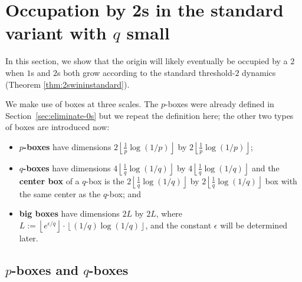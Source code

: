 \documentclass{article}
\newcommand{\floor}[1]{\left\lfloor#1\right \rfloor}
\numberwithin{equation}{section}
\begin{document}
\section{Occupation by 2s in the standard variant with $q$ small}
\label{sec:occupation-2-standard}

In this section, we show that the origin will likely eventually be occupied by a $2$ when $1$s and $2$s both grow according to the standard threshold-$2$ dynamics (Theorem \ref{thm:2swininstandard}).

We make use of boxes at three scales. The $p$-boxes were already defined in
Section~\ref{sec:eliminate-0s} but we repeat the definition here; the other two 
types of boxes are introduced now:
\begin{itemize}
    \item \textbf{$p$-boxes} have dimensions $2\floor{\frac{1}{p}\log(1/p)}$ by $2\floor{\frac{1}{p}\log(1/p)}$;
    \item \textbf{$q$-boxes} have dimensions $4\floor{\frac{1}{q}\log(1/q)}$ by $4\floor{\frac{1}{q}\log(1/q)}$ and the \textbf{center box} of a $q$-box is the $2\floor{\frac{1}{q}\log(1/q)}$ by $2\floor{\frac{1}{q}\log(1/q)}$ box with the same center as the $q$-box; and
    \item \textbf{big boxes} have dimensions $2L$ by $2L$, where $L := \floor{e^{\epsilon/q}}\cdot \floor{(1/q)\log(1/q)}$, and the constant $\epsilon$ will be determined later.
\end{itemize}

\subsection{$p$-boxes and $q$-boxes}
\end{document}
